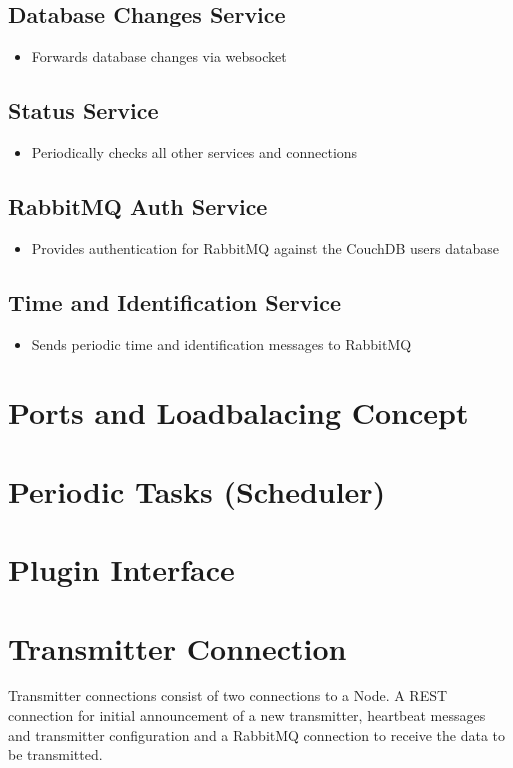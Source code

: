 \subsection{Database Changes Service}
\begin{itemize}
\item Forwards database changes via websocket
\end{itemize}

\subsection{Status Service}
\begin{itemize}
\item Periodically checks all other services and connections
\end{itemize}

\subsection{RabbitMQ Auth Service}
\begin{itemize}
\item Provides authentication for RabbitMQ against the CouchDB users database
\end{itemize}

\subsection{Time and Identification Service}
\begin{itemize}
\item Sends periodic time and identification messages to RabbitMQ
\end{itemize}

\section{Ports and Loadbalacing Concept}

\section{Periodic Tasks (Scheduler)}

\section{Plugin Interface}

\section{Transmitter Connection}
Transmitter connections consist of two connections to a Node. A REST connection
for initial announcement of a new transmitter, heartbeat messages and
transmitter configuration and a RabbitMQ connection to receive the data to be
transmitted.

